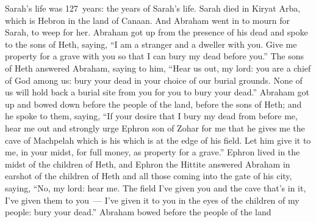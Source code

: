 
\begin{inparaenum}
     Sarah's life was 127~years: the years of Sarah's life.%
     Sarah died in Kiryat Arba, which is Hebron in the land of Canaan. And Abraham went in to mourn for Sarah, to weep for her.%
     Abraham got up from the presence of his dead and spoke to the sons of Heth, saying,%
     ``I am a stranger and a dweller with you. Give me property for a grave with you so that I can bury my dead before you.''%
     The sons of Heth answered Abraham, saying to him,%
     ``Hear us out, my lord: you are a chief of God among us: bury your dead in your choice of our burial grounds. None of us will hold back a burial site from you for you to bury your dead.''%
     Abraham got up and bowed down before the people of the land, before the sons of Heth;%
     and he spoke to them, saying, ``If your desire that I bury my dead from before me, hear me out and strongly urge Ephron son of Zohar for me%
     that he gives me the cave of Machpelah which is his which is at the edge of his field. Let him give it to me, in your midst, for full money, as property for a grave.''%
     Ephron lived in the midst of the children of Heth, and Ephron the Hittite answered Abraham in earshot of the children of Heth and all those coming into the gate of his city, saying,%
     ``No, my lord: hear me. The field I've given you and the cave that's in it, I've given them to you~--- I've given it to you in the eyes of the children of my people: bury your dead.''%
     Abraham bowed before the people of the land%
\end{inparaenum}
